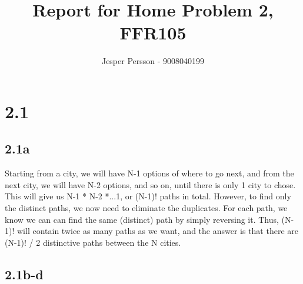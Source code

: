 \documentclass{article}
\title{Report for Home Problem 2, FFR105}
\author{Jesper Persson - 9008040199}
\begin{document}
 
\maketitle

\section{2.1}

\subsection{2.1a}

Starting from a city, we will have N-1 options of where to go next, and from the next city, we will have N-2 options, and so on, until there is only 1 city to chose. This will give us N-1 * N-2 *...1, or (N-1)! paths in total. However, to find only the distinct paths, we now need to eliminate the duplicates. For each path, we know we can can find the same (distinct) path by simply reversing it. Thus, (N-1)! will contain twice as many paths as we want, and the answer is that there are (N-1)! / 2 distinctive paths between the N cities.

\subsection{2.1b-d}
\end{document}
